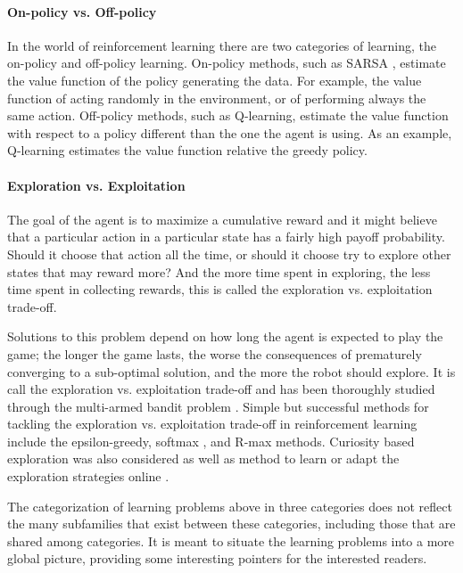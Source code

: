 \paragraph{On-policy vs. Off-policy} In the world of reinforcement learning there are two categories of learning, the on-policy and off-policy learning. On-policy methods, such as SARSA \cite{rummery1994line}, estimate the value function of the policy generating the data. For example, the value function of acting randomly in the environment, or of performing always the same action. Off-policy methods, such as Q-learning, estimate the value function with respect to a policy different than the one the agent is using. As an example, Q-learning \cite{sutton1998reinforcement} estimates the value function relative the greedy policy.

\paragraph{Exploration vs. Exploitation} 
The goal of the agent is to maximize a cumulative reward and it might believe that a particular action in a particular state has a fairly high payoff probability. Should it choose that action all the time, or should it choose try to explore other states that may reward more? And the more time spent in exploring, the less time spent in collecting rewards, this is called the exploration vs. exploitation trade-off. 

Solutions to this problem depend on how long the agent is expected to play the game; the longer the game lasts, the worse the consequences of prematurely converging to a sub-optimal solution, and the more the robot should explore. It is call the exploration vs. exploitation trade-off and has been thoroughly studied through the multi-armed bandit problem \cite{berry1985bandit,audibert2009exploration}. Simple but successful methods for tackling the exploration vs. exploitation trade-off in reinforcement learning include the epsilon-greedy, softmax \cite{sutton1998reinforcement}, and R-max \cite{brafman2003r} methods. Curiosity based exploration \cite{schmidhuber1991curious,storck1995reinforcement,barto2004intrinsically,singh2005intrinsically} was also considered as well as method to learn or adapt the exploration strategies online \cite{mahmood2012tuning,Hester13aamas}.

\transition

The categorization of learning problems above in three categories does not reflect the many subfamilies that exist between these categories, including those that are shared among categories. It is meant to situate the learning problems into a more global picture, providing some interesting pointers for the interested readers. 

